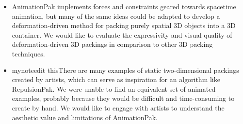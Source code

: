 \begin{itemize}
\item AnimationPak implements forces and constraints geared towards 
	spacetime animation, but many of the same ideas could be adapted
	to develop a deformation-driven method for packing purely spatial
	3D objects into a 3D container.  We would like to evaluate the
	expressivity and visual quality of deformation-driven 3D packings 
	in comparison to other 3D packing techniques.




\item mynote{edit this}There are many examples of static two-dimensional packings
	created by artists, which can
	serve as inspiration for an algorithm like RepulsionPak.  We were
	unable to find an equivalent set of animated examples, probably
	because they would be difficult and time-consuming to create by hand.
	We would like
	to engage with artists to understand the aesthetic value and limitations
	of AnimationPak.

\end{itemize}



